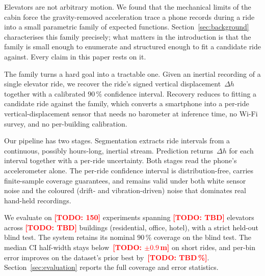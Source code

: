 \documentclass[manuscript,review,screen]{acmart}
\newcommand{\todo}[1]{\textcolor{red}{\textbf{[TODO: #1]}}}
\begin{document}
Elevators are not arbitrary motion.  We found that the mechanical
limits of the cabin force the gravity-removed acceleration trace a
phone records during a ride into a small parametric family of
expected functions.  Section~\ref{sec:background} characterises this
family precisely; what matters in the introduction is that the family
is small enough to enumerate and structured enough to fit a candidate
ride against.  Every claim in this paper rests on it.

The family turns a hard goal into a tractable one.  Given an inertial
recording of a single elevator ride, we recover the ride's signed
vertical displacement~$\Delta h$ together with a calibrated $90\,\%$
confidence interval.  Recovery reduces to fitting a candidate ride
against the family, which converts a smartphone into a per-ride
vertical-displacement sensor that needs no barometer at inference
time, no Wi-Fi survey, and no per-building calibration.

Our pipeline has two stages.  Segmentation extracts ride intervals
from a continuous, possibly hours-long, inertial stream.  Prediction
returns~$\Delta h$ for each interval together with a per-ride
uncertainty.  Both stages read the phone's accelerometer alone.  The
per-ride confidence interval is distribution-free, carries
finite-sample coverage guarantees, and remains valid under both
white sensor noise and the coloured (drift- and vibration-driven)
noise that dominates real hand-held recordings.

We evaluate on \todo{150} experiments spanning \todo{TBD} elevators
across \todo{TBD} buildings (residential, office, hotel), with a
strict held-out blind test.  The system retains its nominal
$90\,\%$ coverage on the blind test.  The median CI half-width
stays below~\todo{$\pm 0.9$\,m} on short rides, and per-bin error
improves on the dataset's prior best by~\todo{TBD\,\%}.
Section~\ref{sec:evaluation} reports the full coverage and error
statistics.
\end{document}
